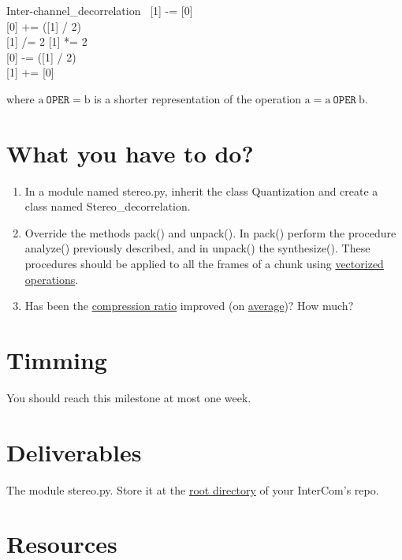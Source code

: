 \begin{pseudocode}{Inter-channel\_decorrelation}{~}
  \BEGIN
    [1] -= [0] \\
    [0] += ([1] / 2) \\
    [1] /= 2
  \END
  \ENDPROCEDURE
  \BEGIN
    [1] *= 2 \\
    [0] -= ([1] / 2) \\
    [1] += [0]
  \END
  \ENDPROCEDURE
\end{pseudocode}

where $\text{a}~\mathtt{OPER}= \text{b}$ is a shorter representation of the operation
$\text{a} = \text{a}~\mathtt{OPER}~\text{b}$.

\section{What you have to do?}

\begin{enumerate}
\item In a module named stereo.py, inherit the class
  Quantization and create a class named Stereo\_decorrelation.
\item Override the methods pack() and unpack(). In
  pack() perform the procedure analyze() previously
  described, and in unpack() the
  synthesize(). These procedures should be applied to
  all the frames of a chunk using \href{https://www.oreilly.com/library/view/python-for-data/9781449323592/ch04.html}{vectorized
    operations}.
\item Has been the
  \href{https://en.wikipedia.org/wiki/Data_compression_ratio}{compression
    ratio} improved (on
  \href{https://en.wikipedia.org/wiki/Average}{average})? How much?
\end{enumerate}

\section{Timming}

You should reach this milestone at most one week.

\section{Deliverables}

The module stereo.py. Store it at the
\href{https://github.com/Tecnologias-multimedia/intercom}{root
  directory} of your InterCom's repo.

\section{Resources}


